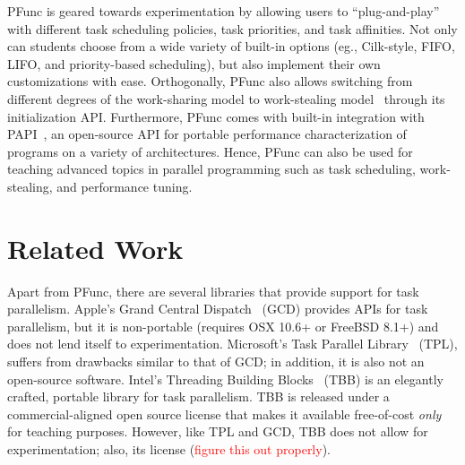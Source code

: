 \documentclass[9pt,twocolumn,letter]{article}
\begin{document}
%
%
PFunc is geared towards experimentation by allowing users to ``plug-and-play''
with different task scheduling policies, task priorities, and task affinities.
%
Not only can students choose from a wide variety of built-in options (eg.,
Cilk-style, FIFO, LIFO, and priority-based scheduling), but also implement
their own customizations with ease.
%
Orthogonally, PFunc also allows switching from different degrees of the
work-sharing model to work-stealing model~\cite{Blumofe94} through its
initialization API.
%
Furthermore, PFunc comes with built-in integration with PAPI~\cite{papi}, an
open-source API for portable performance characterization of programs on a
variety of architectures. 
%
Hence, PFunc can also be used for teaching advanced topics in parallel
programming such as task scheduling, work-stealing, and performance tuning. 

%
%
\section{Related Work}
Apart from PFunc, there are several libraries that provide support for task 
parallelism.
%
Apple's Grand Central Dispatch~\cite{kn:gcd} (GCD) provides APIs for task
parallelism, but it is non-portable (requires OSX 10.6+ or FreeBSD 8.1+) and
does not lend itself to experimentation.
%
Microsoft's Task Parallel Library~\cite{kn:tpl} (TPL), suffers from drawbacks
similar to that of GCD; in addition, it is also not an open-source software.
%
Intel's Threading Building Blocks~\cite{kn:tbb} (TBB) is an elegantly crafted,
portable library for task parallelism.
%
TBB is released under a commercial-aligned open source license that makes it
available free-of-cost \textit{only} for teaching purposes.
%
However, like TPL and GCD, TBB does not allow for experimentation; also, its 
license (\textcolor{red}{figure this out properly}).

\footnotesize


\end{document}
